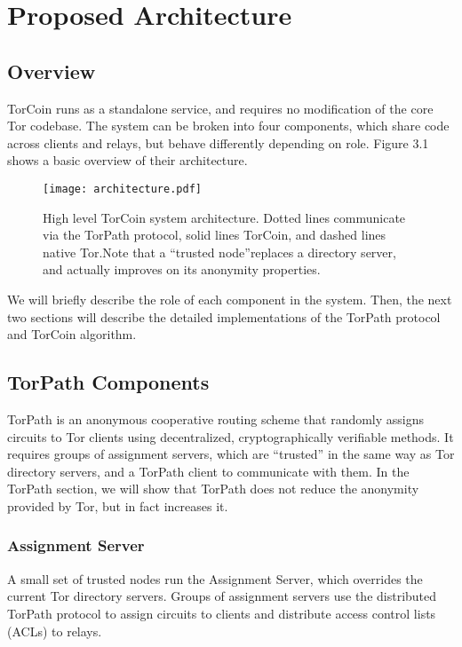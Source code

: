 \section{Proposed Architecture} \label{arch}

\subsection{Overview}

TorCoin runs as a standalone service, and requires no modification of the core
Tor codebase. The system can be broken into four components, which share code
across clients and relays, but behave differently depending on role. Figure 3.1
shows a basic overview of their architecture.

\begin{figure}
  \centering
    \texttt{[image: architecture.pdf]}
  \caption{High level TorCoin system architecture. Dotted lines communicate via
  the TorPath protocol, solid lines TorCoin, and dashed lines native Tor.Note
  that a ``trusted node''replaces a directory server, and actually improves on
  its anonymity properties.}
\end{figure}

We will briefly describe the role of each component in the system. Then, the
next two sections will describe the detailed implementations of the TorPath
protocol and TorCoin algorithm.

\subsection{TorPath Components} TorPath is an anonymous cooperative routing
scheme that randomly assigns circuits to Tor clients using decentralized,
cryptographically verifiable methods. It requires groups of assignment servers,
which are ``trusted'' in the same way as Tor directory servers, and a TorPath
client to communicate with them. In the TorPath section, we will show that
TorPath does not reduce the anonymity  provided by Tor, but in fact increases it.

\subsubsection{Assignment Server} A small set of trusted nodes run the
Assignment Server, which overrides the current Tor directory servers. Groups of
assignment servers use the distributed TorPath protocol to assign circuits to
clients and distribute access control lists (ACLs) to relays.


